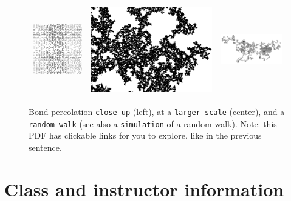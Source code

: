 \documentclass[oneside,11pt]{amsart}
\begin{document}
\begin{figure}[h]
	\begin{tabular}{ccc}
		\includegraphics[height=.32\textwidth]{Bond_percolation_p_51.png}
		&\hspace{10pt}\includegraphics[height=.32\textwidth]{Amas_de_percolation_gray.png}
		&\includegraphics[angle=90,height=.32\textwidth]{RW1.png}
	\end{tabular}
	\def\figurename{}
	\caption{Bond percolation
	\href{https://en.wikipedia.org/wiki/Percolation_theory}{\texttt{close-up}}
	(left),
	at a \href{https://commons.wikimedia.org/wiki/File:Amas_de_percolation.png}{\texttt{larger scale}} (center),
	and
	a 
	\href{https://en.wikipedia.org/wiki/Random_walk\#Lattice_random_walk}{\texttt{random walk}}
	(see also a
	\href{https://upload.wikimedia.org/wikipedia/commons/f/f3/Random_walk_2500_animated.svg}{\texttt{simulation}} 
	of a random walk).
	\tiny{Note:
	this PDF has clickable links for you to explore, like in the previous sentence.}
	}
\end{figure}

\section{Class and instructor information}
\end{document}
